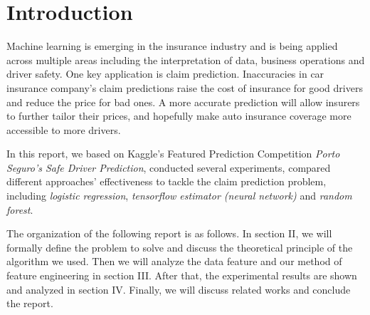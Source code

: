 \documentclass{standalone}
\begin{document}
\section{Introduction}


Machine learning is emerging in the insurance industry and is being applied
across multiple areas including the interpretation of data, business operations
and driver safety. One key application is claim prediction. Inaccuracies in car
insurance company's claim predictions raise the cost of insurance for good
drivers and reduce the price for bad ones. A more accurate prediction will
allow insurers to further tailor their prices, and hopefully make auto
insurance coverage more accessible to more drivers.

In this report, we based on Kaggle's Featured Prediction Competition
\emph{Porto Seguro's Safe Driver Prediction}\cite{kaggle}, conducted several
experiments, compared different approaches' effectiveness to tackle the claim
prediction problem, including \emph{logistic regression}, \emph{tensorflow
estimator (neural network)} and \emph{random forest}.

The organization of the following report is as follows. In section II, we will
formally define the problem to solve and discuss the theoretical principle of
the algorithm we used. Then we will analyze the data feature and our method of
feature engineering in section III. After that, the experimental results are
shown and analyzed in section IV. Finally, we will discuss related works and
conclude the report.
\end{document}

